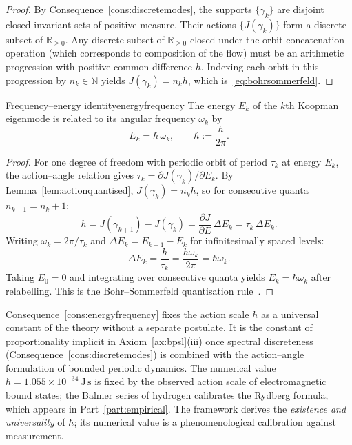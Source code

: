 \begin{proof}
By Consequence~\ref{cons:discretemodes}, the supports $\{\gamma_{k}\}$
are disjoint closed invariant sets of positive measure.
Their actions $\{J(\gamma_{k})\}$ form a discrete subset of
$\mathbb{R}_{\ge 0}$.
Any discrete subset of $\mathbb{R}_{\ge 0}$ closed under the orbit
concatenation operation (which corresponds to composition of the flow)
must be an arithmetic progression with positive common difference $h$.
Indexing each orbit in this progression by $n_{k}\in\mathbb{N}$ yields
$J(\gamma_{k})=n_{k}h$, which is~\eqref{eq:bohrsommerfeld}.
\end{proof}

\begin{consequence}{Frequency--energy identity}{energyfrequency}
The energy $E_{k}$ of the $k$th Koopman eigenmode is related to its
angular frequency $\omega_{k}$ by
\begin{equation}
  \boxed{E_{k} = \hbar\,\omega_{k},}
  \qquad \hbar := \frac{h}{2\pi}.
  \label{eq:ehbaromega}
\end{equation}
\end{consequence}

\begin{proof}
For one degree of freedom with periodic orbit of period $\tau_{k}$ at
energy $E_{k}$, the action--angle relation gives
$\tau_{k}=\partial J(\gamma_{k})/\partial E_{k}$.
By Lemma~\ref{lem:actionquantised}, $J(\gamma_{k})=n_{k}h$, so for
consecutive quanta $n_{k+1}=n_{k}+1$:
\begin{equation*}
  h = J(\gamma_{k+1})-J(\gamma_{k})
    = \frac{\partial J}{\partial E}\,\Delta E_{k}
    = \tau_{k}\,\Delta E_{k}.
\end{equation*}
Writing $\omega_{k}=2\pi/\tau_{k}$ and $\Delta E_{k}=E_{k+1}-E_{k}$
for infinitesimally spaced levels:
\begin{equation*}
  \Delta E_{k}
  = \frac{h}{\tau_{k}}
  = \frac{h\omega_{k}}{2\pi}
  = \hbar\omega_{k}.
\end{equation*}
Taking $E_{0}=0$ and integrating over consecutive quanta yields
$E_{k}=\hbar\omega_{k}$ after relabelling.
This is the Bohr--Sommerfeld quantisation
rule~\citep{bohr1913,sommerfeld1915,einstein1917}.
\end{proof}

\begin{remark}
Consequence~\ref{cons:energyfrequency} fixes the action scale $\hbar$ as
a universal constant of the theory without a separate postulate.
It is the constant of proportionality implicit in Axiom~\ref{ax:bpsl}(iii)
once spectral discreteness (Consequence~\ref{cons:discretemodes}) is
combined with the action--angle formulation of bounded periodic dynamics.
The numerical value $\hbar=1.055\times 10^{-34}\ \mathrm{J\,s}$ is fixed
by the observed action scale of electromagnetic bound states; the Balmer
series of hydrogen calibrates the Rydberg formula, which appears in
Part~\ref{part:empirical}.
The framework derives the \emph{existence and universality} of $\hbar$;
its numerical value is a phenomenological calibration against measurement.
\end{remark}

